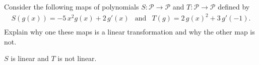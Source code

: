 
\begin{exerciseStatement}


Consider the following maps of polynomials \(S:\mathcal{P}\rightarrow\mathcal{P}\) and \(T:\mathcal{P}\rightarrow\mathcal{P}\) defined by 
\begin{align*} S(g(x))= -5 \, x^{2} g\left(x\right) + 2 \, g'\left(x\right)  & \text{and} & T(g)= 2 \, g\left(x\right)^{2} + 3 \, g'\left(-1\right) . \\ \end{align*}
             Explain why one these maps is a linear transformation and why the other map is not. 


\end{exerciseStatement}
    
\begin{exerciseAnswer} 


\(S\) is linear and \(T\) is not linear.


\end{exerciseAnswer}
    
